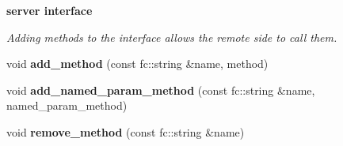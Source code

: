 \begin{Indent}\textbf{ server interface}\par
{\em Adding methods to the interface allows the remote side to call them. }\begin{DoxyCompactItemize}
\item 
\mbox{\label{classfc_1_1rpc_1_1json__connection_a02c51133b2fde02b823f2b90f6f24108}} 
void {\bfseries add\+\_\+method} (const fc\+::string \&name, method)
\item 
\mbox{\label{classfc_1_1rpc_1_1json__connection_ae7e06df5159be667f97606fdcc43f160}} 
void {\bfseries add\+\_\+named\+\_\+param\+\_\+method} (const fc\+::string \&name, named\+\_\+param\+\_\+method)
\item 
\mbox{\label{classfc_1_1rpc_1_1json__connection_af24f0f931c4c86d6eb5a85a71c2974e9}} 
void {\bfseries remove\+\_\+method} (const fc\+::string \&name)
\end{DoxyCompactItemize}
\end{Indent}
